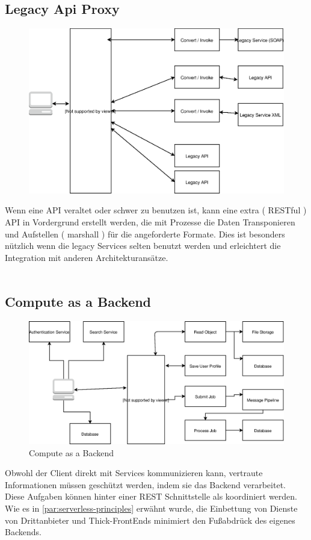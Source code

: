 \documentclass[
12pt,
english,
ngerman,
headsepline,
twoside,
openright,
numbers=noenddot,version=first
]{scrreprt}
\begin{document}
\subsection{Legacy Api Proxy}
\begin{figure}
	\includegraphics[width=0.9\linewidth]{./pics/legacy-api-proxy.eps}
\end{figure}
Wenn eine \acrshort{API} veraltet oder schwer zu benutzen ist, kann eine extra ( RESTful ) \acrshort{API} in Vordergrund erstellt werden, die  mit Prozesse die Daten Transponieren und Aufstellen ( marshall ) für die angeforderte Formate. Dies ist besonders nützlich wenn die legacy Services selten benutzt werden und erleichtert die Integration mit anderen Architekturansätze.
\\
\\


\subsection{Compute as a Backend}
\begin{figure}
	\includegraphics[scale=0.36]{./pics/compute-as-a-backend.eps}
	\caption{Compute as a Backend}
	\label{pic:compute-backend}
\end{figure}
Obwohl der Client direkt mit Services kommunizieren kann, vertraute Informationen müssen geschützt werden, indem sie das Backend verarbeitet\cite{serverlessArchAWS}. Diese Aufgaben können hinter einer \acrshort{REST} Schnittstelle als koordiniert werden. Wie es in \autoref{par:serverless-principles} erwähnt wurde, die Einbettung von Dienste von Drittanbieter und Thick-FrontEnds minimiert den Fußabdrück des eigenes Backends.
\end{document}
